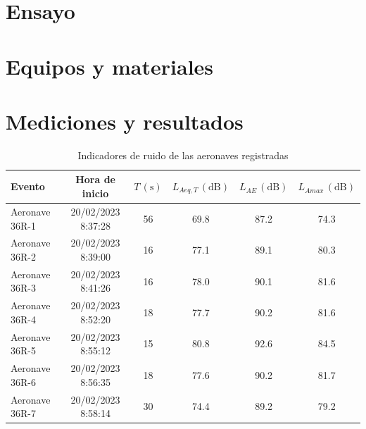 \documentclass[11pt]{article}
\begin{document}
\section{Ensayo}
\section{Equipos y materiales}
\section{Mediciones y resultados}

\begin{table}[htbp]
    \centering
    \caption{Indicadores de ruido de las aeronaves registradas}
    \begin{tabular}{|l|c|c|c|c|c|} \hline
        Evento                                              & Hora de inicio     & $T \, (\unit{\s})$ & $L_{Aeq,T}\, (\unit{\dB})$ & $L_{AE}\, (\unit{\dB})$ & $L_{Amax}\, (\unit{\dB})$ \\ \hline
        \rowcolor[rgb]{ .867,  .922,  .969} Aeronave 36R-1  & 20/02/2023 8:37:28 & 56                 & 69.8                       & 87.2                    & 74.3                      \\ \hline
        \rowcolor[rgb]{ .867,  .922,  .969} Aeronave 36R-2  & 20/02/2023 8:39:00 & 16                 & 77.1                       & 89.1                    & 80.3                      \\ \hline
        \rowcolor[rgb]{ .867,  .922,  .969} Aeronave 36R-3  & 20/02/2023 8:41:26 & 16                 & 78.0                       & 90.1                    & 81.6                      \\ \hline
        \rowcolor[rgb]{ .867,  .922,  .969} Aeronave 36R-4  & 20/02/2023 8:52:20 & 18                 & 77.7                       & 90.2                    & 81.6                      \\ \hline
        \rowcolor[rgb]{ .867,  .922,  .969} Aeronave 36R-5  & 20/02/2023 8:55:12 & 15                 & 80.8                       & 92.6                    & 84.5                      \\ \hline
        \rowcolor[rgb]{ .867,  .922,  .969} Aeronave 36R-6  & 20/02/2023 8:56:35 & 18                 & 77.6                       & 90.2                    & 81.7                      \\ \hline
        \rowcolor[rgb]{ .867,  .922,  .969} Aeronave 36R-7  & 20/02/2023 8:58:14 & 30                 & 74.4                       & 89.2                    & 79.2                      \\ \hline

\end{tabular}
\end{table}
\end{document}
